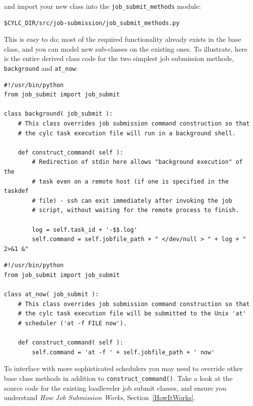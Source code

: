 \documentclass[11pt,a4paper]{article}
\begin{document}
and import your new class into the \lstinline=job_submit_methods= module:

\begin{lstlisting}
$CYLC_DIR/src/job-submission/job_submit_methods.py
\end{lstlisting}

This is easy to do; most of the required functionality already exists in
the base class, and you can model new sub-classes on the existing ones.
To illustrate, here is the entire derived class code for the two
simplest job submission methods, \lstinline=background= and
\lstinline=at_now=:

\lstset{language=Python}

\begin{lstlisting}
#!/usr/bin/python
from job_submit import job_submit

class background( job_submit ):
    # This class overrides job submission command construction so that
    # the cylc task execution file will run in a background shell.
    
    def construct_command( self ):
        # Redirection of stdin here allows "background execution" of the
        # task even on a remote host (if one is specified in the taskdef
        # file) - ssh can exit immediately after invoking the job
        # script, without waiting for the remote process to finish.

        log = self.task_id + '-$$.log'
        self.command = self.jobfile_path + " </dev/null > " + log + " 2>&1 &" 
\end{lstlisting}

\begin{lstlisting}
#!/usr/bin/python
from job_submit import job_submit

class at_now( job_submit ):
    # This class overrides job submission command construction so that
    # the cylc task execution file will be submitted to the Unix 'at'
    # scheduler ('at -f FILE now').

    def construct_command( self ):
        self.command = 'at -f ' + self.jobfile_path + ' now'
\end{lstlisting}

To interface with more sophisticated schedulers you may need to
override other base class methods in addition to
\lstinline=construct_command()=. Take a look at the source code for the 
existing loadleveler job submit classes, and ensure you understand 
{\em How Job Submission Works}, Section~\ref{HowItWorks}.
\end{document}
